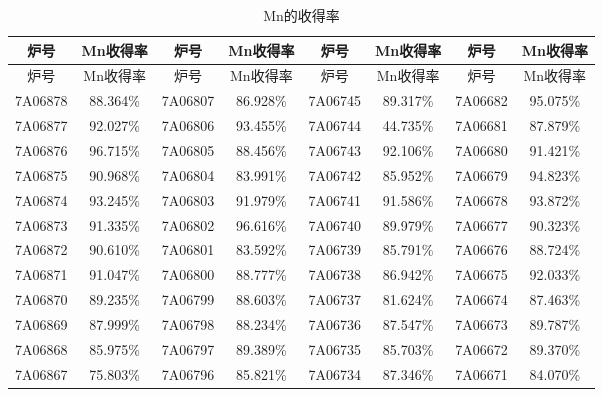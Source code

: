 \documentclass[12pt]{article}%
\begin{document}
\begin{longtable}{|cc|cc|cc|cc|}
    \caption{Mn的收得率}
    \label{table:Mn}  \\ %
    \hline
炉号 & {Mn收得率} & 炉号 & {Mn收得率} & 炉号 & {Mn收得率} & {炉号} & {Mn收得率} \\
\hline \endfirsthead
\hline
炉号 & {Mn收得率} & 炉号 & {Mn收得率} & 炉号 & {Mn收得率} &{炉号} & {Mn收得率} \\
\hline
\endhead
\hline
    \endfoot


7A06878              & 88.364\% & 7A06807              & 86.928\% & 7A06745              & 89.317\% & 7A06682              & 95.075\% \\
7A06877              & 92.027\% & 7A06806              & 93.455\% & 7A06744              & 44.735\% & 7A06681              & 87.879\% \\
7A06876              & 96.715\% & 7A06805              & 88.456\% & 7A06743              & 92.106\% & 7A06680              & 91.421\% \\
7A06875              & 90.968\% & 7A06804              & 83.991\% & 7A06742              & 85.952\% & 7A06679              & 94.823\% \\
7A06874              & 93.245\% & 7A06803              & 91.979\% & 7A06741              & 91.586\% & 7A06678              & 93.872\% \\
7A06873              & 91.335\% & 7A06802              & 96.616\% & 7A06740              & 89.979\% & 7A06677              & 90.323\% \\
7A06872              & 90.610\% & 7A06801              & 83.592\% & 7A06739              & 85.791\% & 7A06676              & 88.724\% \\
7A06871              & 91.047\% & 7A06800              & 88.777\% & 7A06738              & 86.942\% & 7A06675              & 92.033\% \\
7A06870              & 89.235\% & 7A06799              & 88.603\% & 7A06737              & 81.624\% & 7A06674              & 87.463\% \\
7A06869              & 87.999\% & 7A06798              & 88.234\% & 7A06736              & 87.547\% & 7A06673              & 89.787\% \\
7A06868              & 85.975\% & 7A06797              & 89.389\% & 7A06735              & 85.703\% & 7A06672              & 89.370\% \\
7A06867              & 75.803\% & 7A06796              & 85.821\% & 7A06734              & 87.346\% & 7A06671              & 84.070\% \\

\end{longtable}
\end{document}
